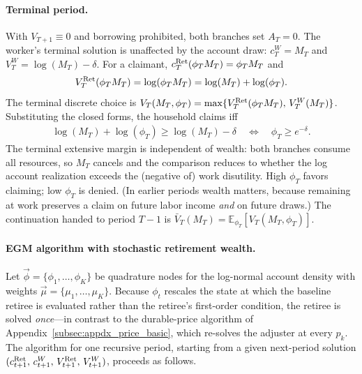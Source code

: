 \paragraph{Terminal period.}
With $V_{T+1}\equiv 0$ and borrowing prohibited, both branches set $A_T=0$. The worker's terminal solution is unaffected by the account draw: $c_T^{W}=M_T$ and $V_T^{W}=\log(M_T)-\delta$. For a claimant, $c_T^{\mathrm{Ret}}(\phi_T M_T)=\phi_T M_T$ and
\begin{align}
	V_T^{\mathrm{Ret}}(\phi_T M_T) = \log(\phi_T M_T) = \log(M_T)+\log(\phi_T).
	\label{eq:ret_price_terminal}
\end{align}
The terminal discrete choice is $V_T(M_T,\phi_T)=\max\{V_T^{\mathrm{Ret}}(\phi_T M_T),\,V_T^{W}(M_T)\}$. Substituting the closed forms, the household claims iff
\begin{align}
	\log(M_T)+\log(\phi_T)
	\ge \log(M_T)-\delta
	\quad\Longleftrightarrow\quad
	\phi_T \ge e^{-\delta}.
	\label{eq:ret_price_terminal_threshold}
\end{align}
The terminal extensive margin is independent of wealth: both branches consume all resources, so $M_T$ cancels and the comparison reduces to whether the log account realization exceeds the (negative of) work disutility. High $\phi_T$ favors claiming; low $\phi_T$ is denied. (In earlier periods wealth matters, because remaining at work preserves a claim on future labor income \emph{and} on future draws.) The continuation handed to period $T-1$ is $\bar V_T(M_T)=\mathbb{E}_{\phi_T}[V_T(M_T,\phi_T)]$.

\paragraph{EGM algorithm with stochastic retirement wealth.}
Let $\vec\phi=\{\phi_1,\dots,\phi_K\}$ be quadrature nodes for the log-normal account density with weights $\vec\mu=\{\mu_1,\dots,\mu_K\}$. Because $\phi_t$ rescales the state at which the baseline retiree is evaluated rather than the retiree's first-order condition, the retiree is solved \emph{once}---in contrast to the durable-price algorithm of Appendix~\ref{subsec:appdx_price_basic}, which re-solves the adjuster at every $p_k$. The algorithm for one recursive period, starting from a given next-period solution $(c_{t+1}^{\mathrm{Ret}},\,c_{t+1}^{W},\,V_{t+1}^{\mathrm{Ret}},\,V_{t+1}^{W})$, proceeds as follows.

